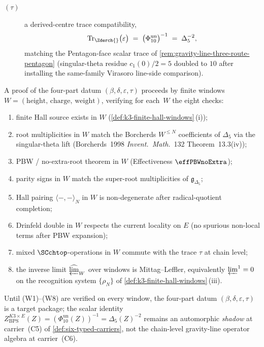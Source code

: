 \begin{conjecture}
\begin{description}
\item[$(\tau)$] a derived-centre trace compatibility,
\[
 \mathrm{Tr}_{\Zderch{}}\bigl(\varepsilon\bigr)
 \;=\; \bigl(\Phi_{10}^{\mathrm{un}}\bigr)^{-1}
 \;=\; \Delta_{5}^{-2},
\]
matching the Pentagon-face scalar trace of
\cref{rem:gravity-line-three-route-pentagon} (singular-theta residue
$c_{1}(0)/2 = 5$ doubled to $10$ after installing the same-family
Virasoro line-side comparison).
\end{description}
A proof of the four-part datum $(\beta, \delta, \varepsilon, \tau)$
proceeds by finite windows
$W = (\mathrm{height},\, \mathrm{charge},\, \mathrm{weight})$,
verifying for each~$W$ the eight checks:
\begin{enumerate}[label=\textup{(W\arabic*)}]
\item finite Hall source exists in $W$
(\cref{def:k3-finite-hall-windows}\,(i));
\item root multiplicities in $W$ match the Borcherds $W^{\le N}$
coefficients of $\Delta_{5}$ via the singular-theta lift
(Borcherds~1998 \emph{Invent.~Math.}~132 Theorem~13.3(iv));
\item PBW / no-extra-root theorem in $W$ (Effectiveness
$\effPBWnoExtra$);
\item parity signs in $W$ match the super-root multiplicities of
$\mathfrak g_{\Delta_5}$;
\item Hall pairing $\langle - , - \rangle_{N}$ in $W$ is
non-degenerate after radical-quotient completion;
\item Drinfeld double in $W$ respects the current locality on $E$
(no spurious non-local terms after PBW expansion);
\item mixed $\SCchtop$-operations in $W$ commute with the trace
$\tau$ at chain level;
\item the inverse limit $\widehat{\varprojlim}_{W}$ over windows is
Mittag--Leffler, equivalently $\varprojlim^{1} = 0$ on the
recognition system $\{\rho_{N}\}$ of
\cref{def:k3-finite-hall-windows}\,(iii).
\end{enumerate}
Until \textup{(W1)}--\textup{(W8)} are verified on every window, the
four-part datum $(\beta, \delta, \varepsilon, \tau)$ is a target
package; the scalar identity
$Z_{\mathrm{BPS}}^{K3 \times E}(Z) =
(\Phi_{10}^{\mathrm{un}}(Z))^{-1} = \Delta_{5}(Z)^{-2}$
remains an automorphic \emph{shadow} at carrier~\textup{(C5)} of
\cref{def:six-typed-carriers}, not the chain-level gravity-line
operator algebra at carrier~\textup{(C6)}.
\end{conjecture}

